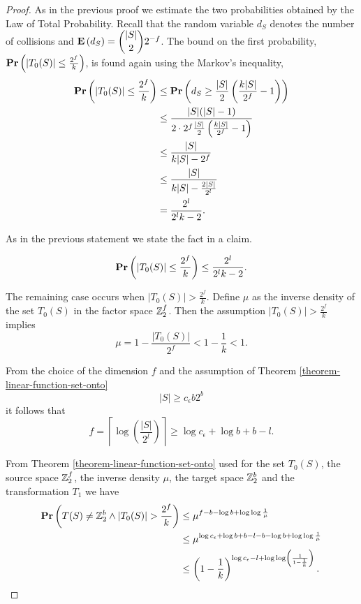 \begin{proof}
As in the previous proof we estimate the two probabilities obtained by the Law of Total Probability. Recall that the random variable $d_S$ denotes the number of collisions and $\mathbf{E}\left(d_S\right) = \dbinom{|S|}{2}2 ^ {-f}$. The bound on the first probability, $\mathbf{Pr}\left(|T_0(S)| \leq \frac{2 ^ f}{k}\right)$, is found again using the Markov's inequality,
\[
\begin{split}
\mathbf{Pr}\left(|T_0(S)| \leq \frac{2 ^ f}{k}\right) 
	& \leq \mathbf{Pr}\left(d_S \geq \frac{|S|}{2} \left( \frac{k|S|}{2 ^ f} - 1 \right)\right) \\
	& \leq \frac{|S|(|S| - 1)}{2 \cdot 2^f \frac{|S|}{2}\left(\frac{k|S|}{2 ^ f} - 1\right)} \\
	& \leq \frac{|S|}{k|S| - 2 ^ f} \\
	& \leq \frac{|S|}{k|S| - \frac{2|S|}{2^l}} \\ 
	& = \frac{2^l}{2^l k - 2} \text{.}
\end{split}
\]

As in the previous statement we state the fact in a claim.
\begin{claim}
\label{claim-better-c-e-probability-1}
\[
\mathbf{Pr}\left(|T_0(S)| \leq \frac{2 ^ f}{k}\right) \leq \frac{2^l}{2^l k - 2} \text{.}
\]
\end{claim}

The remaining case occurs when $|T_0(S)| > \frac {2 ^ f}{k}$. Define $\mu$ as the inverse density of the set $T_0(S)$ in the factor space $\mathbb{Z}_{2}^{f}$. Then the assumption $|T_0(S)| > \frac {2 ^ f}{k}$ implies
\[
	\mu = 1 - \frac{|T_0(S)|}{2 ^ f} < 1 - \frac{1}{k} < 1 \text{.}
\]

From the choice of the dimension $f$ and the assumption of Theorem \ref{theorem-linear-function-set-onto} \[ |S| \geq c_\epsilon b 2 ^ b \] it follows that
\[
	f = \left\lceil \log \left( \frac{|S|}{2 ^ l} \right) \right\rceil \geq \log c_\epsilon + \log b  + b - l \text{.}
\]

From Theorem \ref{theorem-linear-function-set-onto} used for the set $T_0(S)$, the source space $\mathbb{Z}_{2}^{f}$, the inverse density $\mu$, the target space $\mathbb{Z}_{2}^{b}$ and the transformation $T_1$ we have 
\[
\begin{split}
\mathbf{Pr}\left(T(S) \neq \mathbb{Z}_{2}^{b} \wedge |T_0(S)| > \frac {2 ^ f}{k}\right) 
	& \leq \mu ^ {f - b - \log b + \log \log \frac{1}{\mu}} \\ 
	& \leq \mu ^ {\log c_\epsilon + \log b + b - l - b - \log b + \log \log \frac{1}{\mu}} \\ 
	& \leq \left(1 - \frac{1}{k}\right) ^ {\log c_\epsilon - l + \log \log \left(\frac{1}{1 - \frac{1}{k}} \right)} \text{.}
\end{split}
\]


\end{proof}
